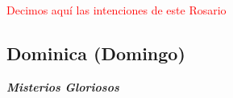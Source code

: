 \documentclass[10pt,twoside]{book}
\begin{document}
\begin{paracol}{2}
      \begin{leftcolumn*}
            
      \end{leftcolumn*}
      \begin{otherlanguage}{latin}
            \begin{rightcolumn}
                
            \end{rightcolumn}
      \end{otherlanguage}

      \begin{leftcolumn*}
            
      \end{leftcolumn*}
      \begin{otherlanguage}{latin}
            \begin{rightcolumn}
                
            \end{rightcolumn}
      \end{otherlanguage}
\end{paracol}

\vspace{0.5em}

\begin{center}
      \textcolor{red}{Decimos aquí las intenciones de este Rosario}
\end{center}

\vspace{-1em}

\begin{center}
      \section*{Dominica (Domingo)}

      \textbf{\textsl{\large Misterios Gloriosos}}
\end{center}

\vspace{0.5em}



\vspace{0.5em}


\end{document}
